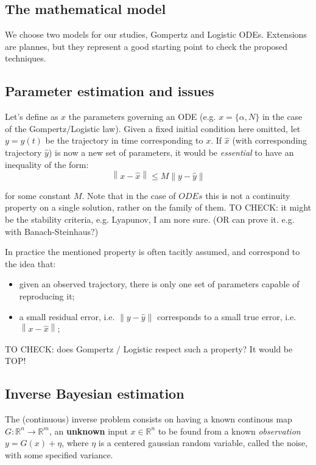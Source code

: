 \documentclass[6pt]{article}
\newcommand{\norm}[1]{\left\lVert#1\right\rVert}
\begin{document}
\subsection {The mathematical model}
We choose two models for our studies, Gompertz and Logistic ODEs.
Extensions are plannes, but they represent a good starting point to check
the proposed techniques.

\subsection{Parameter estimation and issues}
Let's define as $x$ the parameters governing an ODE (e.g. $x = \{ \alpha, N\}$
in the case of the Gompertz/Logistic law). Given a fixed initial condition here
omitted, let $y = y(t)$ be the trajectory in time corresponding to $x$.
If $\hat{x}$ (with corresponding trajectory $\hat{y}$) is now a new set of 
parameters, it would be \emph{essential} to have an inequality of the form:
\begin{equation}
\norm{ x - \hat{x} } \leq M \norm{y - \hat{y} }
\end{equation}

for some constant $M$. Note that in the case of $ODEs$ this is not a continuity
property on a single solution, rather on the family of them. 
TO CHECK: it might be the stability criteria, e.g. Lyapunov, I am nore sure.
(OR can prove it. e.g. with Banach-Steinhaus?)

In practice the mentioned property is often tacitly assumed, and correspond
to the idea that:
\begin{itemize}
\item given an observed trajectory, there is only one set of parameters 
	capable of reproducing it;
\item a small residual error, i.e. $\norm{y - \hat{y}}$ corresponds to a small
	true error, i.e. $\norm{x - \hat{x}}$;
\end{itemize}

TO CHECK: does Gompertz / Logistic respect such a property? It would be TOP!


\subsection {Inverse Bayesian estimation}
The (continuous) inverse problem consists on having a known continous map
$G: \mathbb{R}^n \to \mathbb{R}^m$, an \textbf{unknown} 
input $x \in \mathbb{R}^n$ to be found from
a known \emph{observation} $y = G(x) + \eta$, where $\eta$ is a centered
gaussian random variable, called the noise, with some specified variance.
\end{document}
